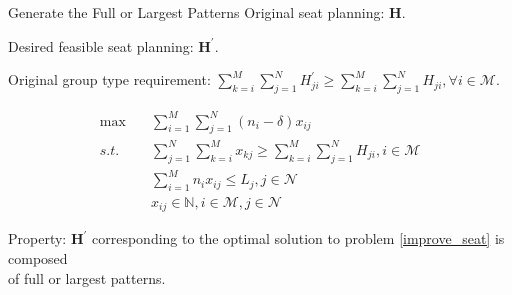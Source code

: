   \begin{frame}{Generate the Full or Largest Patterns}
    \small
    Original seat planning: $\bm{H}$.

    Desired feasible seat planning: $\bm{H}^{\prime}$.
    
    Original group type requirement: $\sum_{k=i}^{M} \sum_{j=1}^{N} H^{'}_{ji} \geq \sum_{k=i}^{M} \sum_{j=1}^{N} H_{ji}, \forall i \in \mathcal{M}$.

    \begin{equation}\label{improve_seat}
      \begin{aligned}
      \max \quad & \sum_{i=1}^{M} \sum_{j=1}^{N} (n_i-\delta)  x_{ij} \\
      s.t. \quad & \sum_{j=1}^{N} \sum_{k=i}^{M} x_{kj} \geq  \sum_{k=i}^{M} \sum_{j=1}^{N} H_{ji}, i \in \mathcal{M} \\
      & \sum_{i=1}^{M} n_{i} x_{ij} \leq L_{j}, j \in \mathcal{N} \\
      & x_{ij} \in \mathbb{N}, i \in \mathcal{M}, j \in \mathcal{N}
      \end{aligned}
    \end{equation}

    Property: {\color{red}$\bm{H}^{\prime}$} corresponding to the optimal solution to problem \eqref{improve_seat}  is composed \\ \hspace{1.5cm} of {\color{red}full or largest patterns}.
  \end{frame}

  